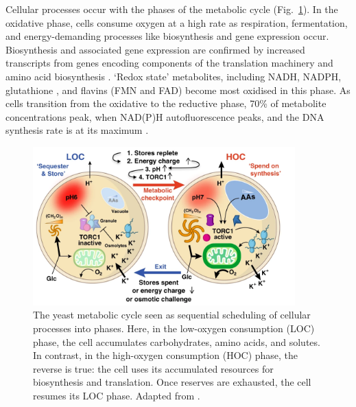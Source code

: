 Cellular processes occur with the phases of the metabolic cycle (Fig.\ \ref{fig:intro-ymc-overview-oneill}).
In the oxidative phase, cells consume oxygen at a high rate as respiration, fermentation, and
energy-demanding processes
like biosynthesis and gene expression occur.
Biosynthesis and associated gene expression are confirmed by increased transcripts from genes encoding components of the translation machinery and amino acid biosynthesis \parencite{tuLogicYeastMetabolic2005}.
`Redox state' metabolites, including NADH, NADPH, glutathione \parencite{lloydUltradianMetronomeTimekeeper2005}, and flavins (FMN and FAD)
\parencite{murrayRedoxRegulationRespiring2011} become most oxidised in this phase.
As cells transition from the oxidative to the reductive phase, 70\% of metabolite concentrations peak, when NAD(P)H autofluorescence peaks, and the DNA synthesis rate is at its maximum \parencite{lloydTemporalArchitectureEukaryotic2006}.

\begin{figure}[h!]
  \centering
  \includegraphics[width=0.9\textwidth]{oneillEukaryoticCellBiology2020_3a_adapted}
  \caption[
    The yeast metabolic cycle seen as sequential scheduling of cellular processes into phases
  ]{
    The yeast metabolic cycle seen as sequential scheduling of cellular processes into phases.
    Here, in the low-oxygen consumption (LOC) phase, the cell accumulates carbohydrates, amino acids, and solutes.
    In contrast, in the high-oxygen consumption (HOC) phase, the reverse is true:
    the cell uses its accumulated resources for biosynthesis and translation.
    Once reserves are exhausted, the cell resumes its LOC phase.
    Adapted from \textcite{oneillEukaryoticCellBiology2020}.}
  \label{fig:intro-ymc-overview-oneill}
\end{figure}

